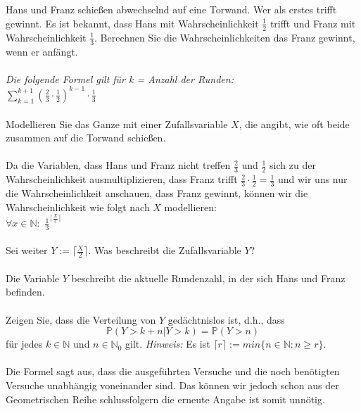 \documentclass[a4paper]{article}
\begin{document}
\subsection{}
Hans und Franz schießen abwechselnd auf eine Torwand. Wer als erstes trifft gewinnt. Es ist bekannt, dass Hans mit Wahrscheinlichkeit $\frac{1}{2}$ trifft und Franz mit Wahrscheinlichkeit $\frac{1}{3}$. Berechnen Sie die Wahrscheinlichkeiten das Franz gewinnt, wenn er anfängt.\\\\
\textit{Die folgende Formel gilt für k = Anzahl der Runden:}\\
\(\sum\limits^{k+1}_{k=1} (\frac{2}{3}\cdot \frac{1}{2})^{k-1} \cdot \frac{1}{3}\)\\\\
Modellieren Sie das Ganze mit einer Zufallsvariable $X$, die angibt, wie oft beide zusammen auf die Torwand schießen.\\\\
Da die Variablen, dass Hans und Franz nicht treffen $\frac{2}{3}$ und $\frac{1}{2}$ sich zu der Wahrscheinlichkeit ausmultiplizieren, dass Franz trifft $\frac{2}{3}\cdot \frac{1}{2}=\frac{1}{3}$ und wir uns nur die Wahrscheinlichkeit anschauen, dass Franz gewinnt, können wir die Wahrscheinlichkeit wie folgt nach $X$ modellieren:\\
$\forall x \in \mathbb{N}:$ $\frac{1}{3}^{\lceil \frac{X}{2} \rceil}$\\\\
Sei weiter $Y := \lceil \frac{X}{2} \rceil$. Was beschreibt die Zufallsvariable $Y$?\\\\
Die Variable $Y$ beschreibt die aktuelle Rundenzahl, in der sich Hans und Franz befinden.\\\\
Zeigen Sie, dass die Verteilung von $Y$ gedächtnislos ist, d.h., dass 
\[\mathbb{P}(Y >k+n \vert Y >k)=\mathbb{P}(Y >n)\]
für jedes $k\in \mathbb{N}$ und $n\in \mathbb{N}_0$  gilt. \textit{Hinweis:} Es ist $\lceil r\rceil := min\{n \in \mathbb{N}:n\geq r\}$.\\\\
Die Formel sagt aus, dass die ausgeführten Versuche und die noch benötigten Versuche unabhängig voneinander sind. Das können wir jedoch schon aus der Geometrischen Reihe schlussfolgern die erneute Angabe ist somit unnötig.
\end{document}
